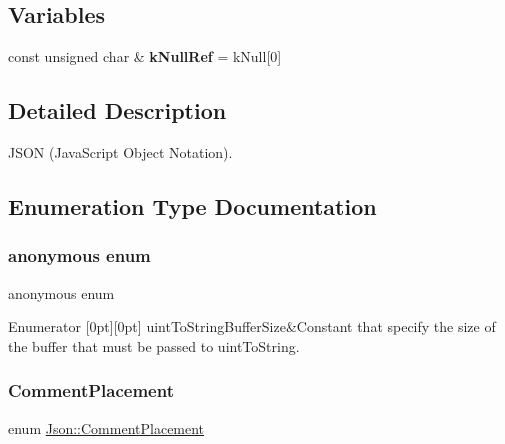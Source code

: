 \subsection*{Variables}
\begin{DoxyCompactItemize}
\item 
\mbox{\label{namespace_json_ab30055b4bbd82aecaca57ccecd63bbe6}} 
const unsigned char \& {\bfseries k\+Null\+Ref} = k\+Null\mbox{[}0\mbox{]}
\end{DoxyCompactItemize}


\subsection{Detailed Description}
J\+S\+ON (Java\+Script Object Notation). 

\subsection{Enumeration Type Documentation}
\mbox{\label{namespace_json_a2aacab54ef6fc18e833fbd4982a0a23a}} 
\subsubsection{\texorpdfstring{anonymous enum}{anonymous enum}}
{\footnotesize\ttfamily anonymous enum}

\begin{DoxyEnumFields}{Enumerator}
[0pt][0pt]{}\mbox{\label{namespace_json_a2aacab54ef6fc18e833fbd4982a0a23aae4f2008c7919f20d81286121d1374424}} 
uint\+To\+String\+Buffer\+Size&Constant that specify the size of the buffer that must be passed to uint\+To\+String. \\
\hline

\end{DoxyEnumFields}
\mbox{\label{namespace_json_a4fc417c23905b2ae9e2c47d197a45351}} 
\subsubsection{\texorpdfstring{Comment\+Placement}{CommentPlacement}}
{\footnotesize\ttfamily enum \hyperlink{namespace_json_a4fc417c23905b2ae9e2c47d197a45351}{Json\+::\+Comment\+Placement}}

